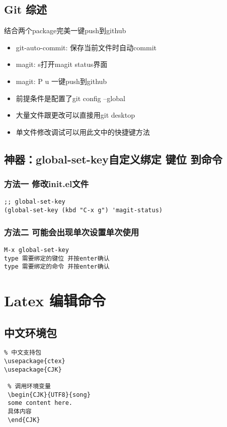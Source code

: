 \documentclass[11pt]{article}
\begin{document}
\subsection{Git 综述}
\label{sec:org677a0e1}
结合两个package完美一键push到github
\begin{itemize}
\item git-auto-commit: 保存当前文件时自动commit
\item magit: s打开magit status界面
\item magit: P u 一键push到github
\item 前提条件是配置了git config --global
\item 大量文件跟更改可以直接用git desktop
\item 单文件修改调试可以用此文中的快捷键方法
\end{itemize}
\subsection{神器：global-set-key自定义绑定 键位 到命令}
\label{sec:org1a78588}
\subsubsection{方法一 修改init.el文件}
\label{sec:orge2519d1}
\begin{verbatim}
;; global-set-key
(global-set-key (kbd "C-x g") 'magit-status)
\end{verbatim}
\subsubsection{方法二 可能会出现单次设置单次使用}
\label{sec:org6be1651}
\begin{verbatim}
M-x global-set-key 
type 需要绑定的键位 并按enter确认
type 需要绑定的命令 并按enter确认
\end{verbatim}
\section{Latex 编辑命令}
\label{sec:orgaee9715}
\subsection{中文环境包}
\label{sec:orgfd67b16}
\begin{verbatim}
% 中文支持包
\usepackage{ctex}
\usepackage{CJK}

 % 调用环境变量 
 \begin{CJK}{UTF8}{song}
 some content here.
 具体内容
 \end{CJK}
\end{verbatim}
\end{document}
